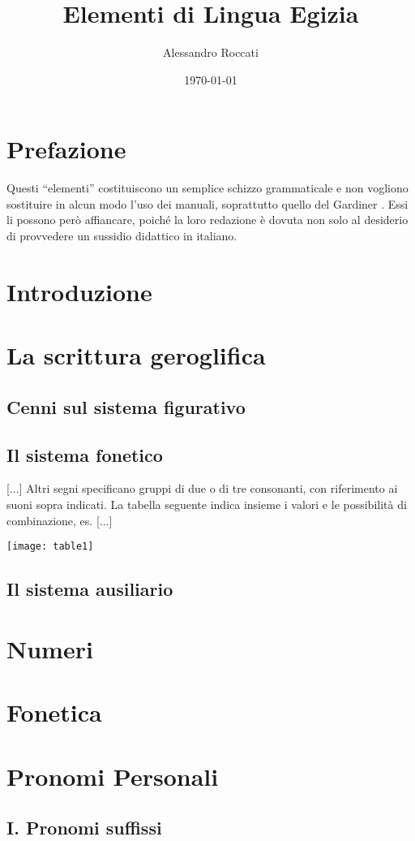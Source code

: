 \documentclass[11pt,a4paper]{amsart}
\author{Alessandro Roccati}
\title{Elementi di Lingua Egizia}
\date{\today}
\newcommand{\aeg}[2][\normalsize]{{#1\pmglyph{#2}}}
\begin{document}
\maketitle
\section*{Prefazione}
Questi ``elementi'' costituiscono un semplice schizzo grammaticale e non vogliono sostituire in alcun modo l'uso dei manuali, soprattutto quello del Gardiner \cite{gardiner1957egyptian}. Essi li possono però affiancare, poiché la loro redazione è dovuta non solo al desiderio di provvedere un sussidio didattico in italiano.
\section{Introduzione}
\section{La scrittura geroglifica}
\subsection{Cenni sul sistema figurativo}
\subsection{Il sistema fonetico}
[...]
Altri segni specificano gruppi di due o di tre consonanti, con riferimento ai suoni sopra indicati. La tabella seguente indica insieme i valori e le possibilità di combinazione, es. \aeg[\tiny]{\HC:\Hn-\Hi-\Hm-\Hms-\Hs}
[...]
% 
\begin{table}[h!]
 \texttt{[image: table1]}
\end{table}
\subsection{Il sistema ausiliario}
\section{Numeri}
\section{Fonetica}
\section{Pronomi Personali}
\subsection{I. Pronomi suffissi}
\end{document}
